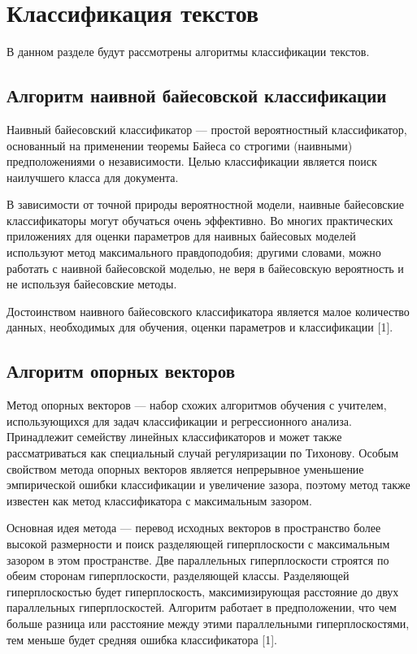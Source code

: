 \section{Классификация текстов}

В данном разделе будут рассмотрены алгоритмы классификации текстов.

\subsection{Алгоритм наивной  байесовской классификации}

Наивный байесовский классификатор — простой вероятностный классификатор, основанный на применении теоремы Байеса со строгими (наивными) предположениями о независимости. Целью классификации является поиск наилучшего класса для документа.

В зависимости от точной природы вероятностной модели, наивные байесовские классификаторы могут обучаться очень эффективно. Во многих практических приложениях для оценки параметров для наивных байесовых моделей используют метод максимального правдоподобия; другими словами, можно работать с наивной байесовской моделью, не веря в байесовскую вероятность и не используя байесовские методы.

Достоинством наивного байесовского классификатора является малое количество данных, необходимых для обучения, оценки параметров и классификации [1].

\subsection{Алгоритм опорных векторов}

Метод опорных векторов — набор схожих алгоритмов обучения с учителем, использующихся для задач классификации и регрессионного анализа. Принадлежит семейству линейных классификаторов и может также рассматриваться как специальный случай регуляризации по Тихонову. Особым свойством метода опорных векторов является непрерывное уменьшение эмпирической ошибки классификации и увеличение зазора, поэтому метод также известен как метод классификатора с максимальным зазором.

Основная идея метода — перевод исходных векторов в пространство более высокой размерности и поиск разделяющей гиперплоскости с максимальным зазором в этом пространстве. Две параллельных гиперплоскости строятся по обеим сторонам гиперплоскости, разделяющей классы. Разделяющей гиперплоскостью будет гиперплоскость, максимизирующая расстояние до двух параллельных гиперплоскостей. Алгоритм работает в предположении, что чем больше разница или расстояние между этими параллельными гиперплоскостями, тем меньше будет средняя ошибка классификатора [1].

